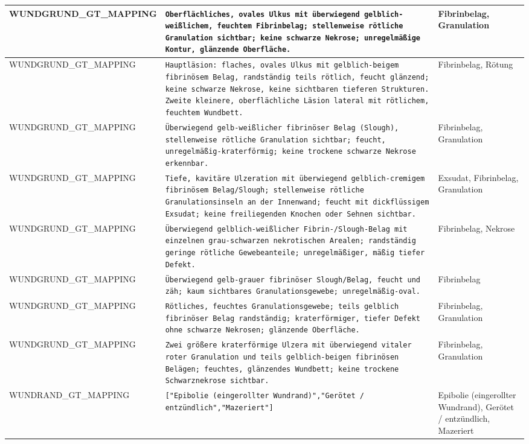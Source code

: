 \begin{longtable}{|p{3.5cm}|p{5cm}|p{6.5cm}|}
WUNDGRUND\_GT\_MAPPING & \texttt{Oberflächliches, ovales Ulkus mit überwiegend gelblich-weißlichem, feuchtem Fibrinbelag; stellenweise rötliche Granulation sichtbar; keine schwarze Nekrose; unregelmäßige Kontur, glänzende Oberfläche.} & Fibrinbelag, Granulation \\ \hline
WUNDGRUND\_GT\_MAPPING & \texttt{Hauptläsion: flaches, ovales Ulkus mit gelblich-beigem fibrinösem Belag, randständig teils rötlich, feucht glänzend; keine schwarze Nekrose, keine sichtbaren tieferen Strukturen. Zweite kleinere, oberflächliche Läsion lateral mit rötlichem, feuchtem Wundbett.} & Fibrinbelag, Rötung \\ \hline
WUNDGRUND\_GT\_MAPPING & \texttt{Überwiegend gelb-weißlicher fibrinöser Belag (Slough), stellenweise rötliche Granulation sichtbar; feucht, unregelmäßig-kraterförmig; keine trockene schwarze Nekrose erkennbar.} & Fibrinbelag, Granulation \\ \hline
WUNDGRUND\_GT\_MAPPING & \texttt{Tiefe, kavitäre Ulzeration mit überwiegend gelblich-cremigem fibrinösem Belag/Slough; stellenweise rötliche Granulationsinseln an der Innenwand; feucht mit dickflüssigem Exsudat; keine freiliegenden Knochen oder Sehnen sichtbar.} & Exsudat, Fibrinbelag, Granulation \\ \hline
WUNDGRUND\_GT\_MAPPING & \texttt{Überwiegend gelblich-weißlicher Fibrin-/Slough-Belag mit einzelnen grau-schwarzen nekrotischen Arealen; randständig geringe rötliche Gewebeanteile; unregelmäßiger, mäßig tiefer Defekt.} & Fibrinbelag, Nekrose \\ \hline
WUNDGRUND\_GT\_MAPPING & \texttt{Überwiegend gelb-grauer fibrinöser Slough/Belag, feucht und zäh; kaum sichtbares Granulationsgewebe; unregelmäßig-oval.} & Fibrinbelag \\ \hline
WUNDGRUND\_GT\_MAPPING & \texttt{Rötliches, feuchtes Granulationsgewebe; teils gelblich fibrinöser Belag randständig; kraterförmiger, tiefer Defekt ohne schwarze Nekrosen; glänzende Oberfläche.} & Fibrinbelag, Granulation \\ \hline
WUNDGRUND\_GT\_MAPPING & \texttt{Zwei größere kraterförmige Ulzera mit überwiegend vitaler roter Granulation und teils gelblich-beigen fibrinösen Belägen; feuchtes, glänzendes Wundbett; keine trockene Schwarznekrose sichtbar.} & Fibrinbelag, Granulation \\ \hline
WUNDRAND\_GT\_MAPPING & \texttt{["Epibolie (eingerollter Wundrand)","Gerötet / entzündlich","Mazeriert"]} & Epibolie (eingerollter Wundrand), Gerötet / entzündlich, Mazeriert \\ \hline

\end{longtable}
